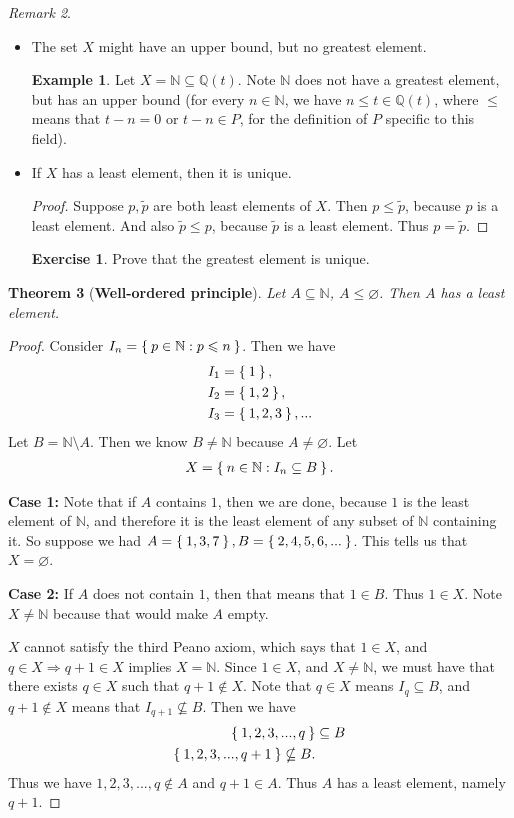 \documentclass[12pt]{amsbook}
\let\emptyset\varnothing
\theoremstyle{plain}
\newtheorem{theorem}{Theorem}[chapter]
\numberwithin{section}{chapter}
\numberwithin{equation}{chapter}
\theoremstyle{definition}
\newtheorem{e}{Exercise}
\newtheorem{Ex}[theorem]{Example}
\theoremstyle{remark}
\newtheorem{rem}[theorem]{Remark}
\theoremstyle{plain}
\newcommand{\sub}{\subseteq}
\newcommand{\nsub}{\nsubseteq}
\newcommand{\n}{\mathbb{N}}
\newcommand{\Q}{\mathbb{Q}}
\newcommand{\bee}{\begin{equation}\begin{aligned}}
\newcommand{\eee}{\end{aligned}\end{equation}}
\newcommand{\tilda}{\tilde}
\renewcommand{\leq}{\leqslant}
\begin{document}
\begin{rem}
\begin{itemize}
\item The set $X$ might have an upper bound, but no greatest element. 
\begin{Ex}
Let $X = \n \sub \Q(t)$. Note $\n$ does not have a greatest element, but has an upper bound (for every $n \in \n$, we have $n \leq t \in \Q(t)$, where $\leq$ means that $t - n = 0$ or $t - n \in P$, for the definition of $P$ specific to this field). 
\end{Ex}
\item If $X$ has a least element, then it is unique. 
\begin{proof}
Suppose $p,\tilde{p}$ are both least elements of $X$. Then $p \leq \tilda{p}$, because $p$ is a least element. And also $\tilda{p} \leq p$, because $\tilda{p}$ is a least element. Thus $p = \tilda{p}$. 
\end{proof}

\begin{e}
Prove that the greatest element is unique. 
\end{e}
\end{itemize}

\end{rem}

\begin{theorem}[\textbf{Well-ordered principle}]
Let $A \sub \n$, $A \leq \emptyset$. Then $A$ has a least element. 
\end{theorem}

\begin{proof}
Consider $I_n = \Set{p \in \n: p \leq n}$. Then we have
\bee
I_1 &= \Set{1},\\
I_2 &= \Set{1,2},\\
I_3 &= \Set{1,2,3},...
\eee
Let $B = \n \setminus A$. Then we know $B \neq \n$ because $A \neq \emptyset$. Let 
\bee
X = \Set{n \in \n: I_n \sub B}.
\eee

\textbf{Case 1: }Note that if $A$ contains $1$, then we are done, because $1$ is the least element of $\n$, and therefore it is the least element of any subset of $\n$ containing it. So suppose we had $A = \Set{1,3,7}, B = \Set{2,4,5,6,...}$. This tells us that $X = \emptyset$. 

\textbf{Case 2:} If $A$ does not contain $1$, then that means that $1 \in B$. Thus $1 \in X$. Note $X \neq \n$ because that would make $A$ empty. 

$X$ cannot satisfy the third Peano axiom, which says that $1 \in X$, and $q \in X \Rightarrow q + 1 \in X$ implies $X = \n$. Since $1 \in X$, and $X \neq \n$, we must have that there exists $q \in X$ such that $q + 1 \notin X$. Note that $q \in X$ means $I_q \sub B$, and $q + 1 \notin X$ means that $I_{q + 1} \nsub B$. Then we have
\bee
\Set{1,2,3,...,q} &\sub B\\
\Set{1,2,3,...,q + 1} \nsub B.
\eee
Thus we have $1,2,3,...,q \notin A$ and $q + 1 \in A$. Thus $A$ has a least element, namely $q + 1$. 
\end{proof}
\end{document}
